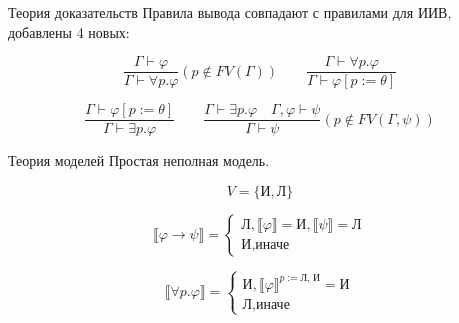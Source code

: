 \documentclass[aspectratio=169]{beamer}
\begin{document}
\begin{frame}{Теория доказательств}
    Правила вывода совпадают с правилами для ИИВ, добавлены 4 новых:

    \[ \dfrac{\Gamma\vdash\varphi}{\Gamma\vdash\forall p.\varphi} (p\notin FV(\Gamma)) \qquad
        \dfrac{\Gamma\vdash\forall p.\varphi}{\Gamma\vdash\varphi[p:=\theta]} \]


    \[ \dfrac{\Gamma\vdash\varphi[p := \theta]}{\Gamma\vdash\exists p.\varphi} \qquad
       \dfrac{\Gamma\vdash\exists p.\varphi\quad\Gamma,\varphi\vdash\psi}{\Gamma\vdash\psi} (p \notin FV(\Gamma,\psi)) \]
\end{frame}

\begin{frame}{Теория моделей}
Простая неполная модель.

$$V = \{ \text{И}, \text{Л} \}$$

 	
 	
 \begin{center}
 		\begin{equation*}
 		\llbracket \varphi\rightarrow\psi\rrbracket = 
 		\begin{cases}
 			\text{Л}, \llbracket\varphi\rrbracket = \text{И}, \llbracket\psi\rrbracket = \text{Л} \\
 			\text{И}, \text{иначе}
 		\end{cases}
 	\end{equation*}
 \end{center}
 	
 	
 	\begin{equation*}
 		\llbracket\forall p.\varphi\rrbracket = 
 		\begin{cases}
 			\text{И}, \llbracket \varphi\rrbracket^{p:=\text{Л, И}} = \text{И} \\
 			\text{Л}, \text{иначе}
 		\end{cases}
 	\end{equation*}


\end{frame}
\end{document}
